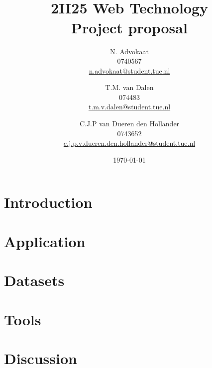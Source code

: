 \documentclass[a4paper,11pt]{article}
\title{
	\HRule\\[0.6cm]
	{\Huge \bfseries 2II25 Web Technology}\\
	{\huge Project proposal}
	\HRule\\[0.4cm]
}
\author{
	N. Advokaat\\
	0740567\\
	\href{mailto:n.advokaat@student.tue.nl}{n.advokaat@student.tue.nl}
	\and
	T.M. van Dalen\\
	074483\\
	\href{mailto:t.m.v.dalen@student.tue.nl}{t.m.v.dalen@student.tue.nl}
	\and
	C.J.P van Dueren den Hollander\\
	0743652\\
	\href{mailto:c.j.p.v.dueren.den.hollander@student.tue.nl}{c.j.p.v.dueren.den.hollander@student.tue.nl}
}
\date{\today}
\begin{document}
	\maketitle
	\thispagestyle{empty}

	\newpage

	\section{Introduction}
	\label{sec:intro}
	

	\section{Application}
	\label{sec:application}
	

	\section{Datasets}
	\label{sec:datasets}
	

	\section{Tools}
	\label{sec:tools}
	

	\section{Discussion}
	\label{sec:discussion}
	
\end{document}
